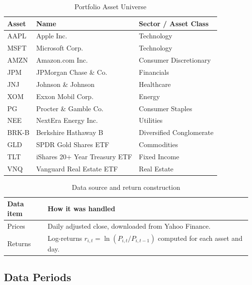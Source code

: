 \documentclass[11pt,a4paper]{article}
\begin{document}
\begin{table}[H]
\centering
\caption{Portfolio Asset Universe}
\label{tab:assets}
\begin{tabular}{lll}
\toprule
Asset & Name & Sector / Asset Class \\
\midrule
AAPL  & Apple Inc.                    & Technology \\
MSFT  & Microsoft Corp.               & Technology \\
AMZN  & Amazon.com Inc.               & Consumer Discretionary \\
JPM   & JPMorgan Chase \& Co.         & Financials \\
JNJ   & Johnson \& Johnson            & Healthcare \\
XOM   & Exxon Mobil Corp.             & Energy \\
PG    & Procter \& Gamble Co.         & Consumer Staples \\
NEE   & NextEra Energy Inc.           & Utilities \\
BRK-B & Berkshire Hathaway B          & Diversified Conglomerate \\
GLD   & SPDR Gold Shares ETF          & Commodities \\
TLT   & iShares 20+ Year Treasury ETF & Fixed Income \\
VNQ   & Vanguard Real Estate ETF      & Real Estate \\
\bottomrule
\end{tabular}
\end{table}

\begin{table}[H]
\centering
\caption{Data source and return construction}
\label{tab:data_handling}
{\small\setlength{\tabcolsep}{4pt}\renewcommand{\arraystretch}{1.15}\begin{tabularx}{\textwidth}{>{\raggedright\arraybackslash}p{4.0cm} X}
\toprule
Data item & How it was handled \\
\midrule
Prices & Daily adjusted close, downloaded from Yahoo Finance. \\
Returns & Log-returns $r_{i,t} = \ln(P_{i,t}/P_{i,t-1})$ computed for each asset and day. \\
\bottomrule
\end{tabularx}}
\end{table}

\subsection{Data Periods}
\end{document}

